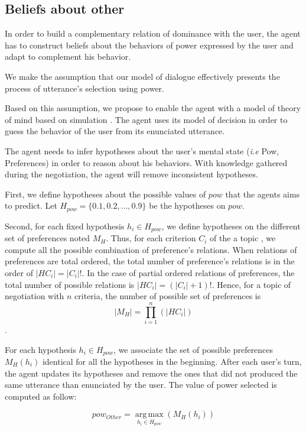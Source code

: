 \documentclass{llncs}
\begin{document}
	\subsection{Beliefs about other}
	
	In order to build a complementary relation of dominance with the user, the agent has to construct beliefs about the behaviors of power expressed by the user and adapt to complement his behavior. 
	
	We make the assumption that our model of dialogue effectively presents the process of utterance's selection using power. 
	
	Based on this assumption, we propose to enable the agent with a model of theory of mind based on simulation \cite{bibid}. The agent uses its model of decision in order to guess the behavior of the user from its enunciated utterance.   
	
	The agent needs to infer hypotheses about the user's mental state (\emph{i.e} Pow, Preferences) in order to reason about his behaviors. With knowledge gathered during the negotiation, the agent will remove inconsistent hypotheses.
	
	First, we define hypotheses about the possible values of $pow$ that the agents aims to predict. Let $H_{pow} = \{0.1, 0.2, \ldots, 0.9\}$ be the hypotheses on $pow$.
	
	Second, for each fixed hypothesis $ h_i \in H_{pow}$, we define hypotheses on the different set of preferences  noted $M_H $. Thus, for each criterion $C_i$ of the a topic , we compute all the possible combination of preference's relations. When relations of preferences are total ordered, the total number of preference's relations is in the order of $|H{C_i}| = |C_i|!$. In the case of partial ordered relations of preferences, the total number of possible relations is  $ |H{C_i}| = (|C_i| + 1)!$. Hence, for a topic of negotiation with $n$ criteria, the number of possible set of preferences is $$ |M_H| = \prod_{i=1}^n (|H{C_i}|)$$. 
	
	For each hypothesis $ h_i \in H_{pow}$, we associate the set of possible preferences $M_H(h_i)$ identical for all the hypotheses in the beginning. After each user's turn, the agent updates its hypotheses and remove the ones that did not produced the same utterance than enunciated by the user. The value of power selected is computed as follow:
	
	\begin{equation}
		pow_{Other} = \operatorname*{arg\,max}_{h_i \in H_{pow}} (M_H(h_i))
	\end{equation} 
	
\end{document}

